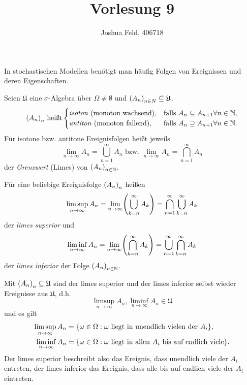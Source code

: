\documentclass{lecture}
\institute{Institut für Statistik und Wirtschaftsmathematik}
\title{Vorlesung 9}
\author{Joshua Feld, 406718}
\begin{document}
    \maketitle


    In stochastischen Modellen benötigt man häufig Folgen von Ereignissen und deren Eigenschaften.

    \begin{definition}
        Seien \(\mathfrak{U}\) eine \(\sigma\)-Algebra über \(\Omega \ne \emptyset\) und \(\parentheses*{A_n}_{n \in N} \subseteq \mathfrak{U}\).
        \[
            \parentheses*{A_n}_n\text{ heißt}\begin{cases}
                \text{\emph{isoton} (monoton wachsend)}, & \text{falls }A_n \subseteq A_{n + 1} \forall n \in \N,\\
                \text{\emph{antiton} (monoton fallend)}, & \text{falls }A_n \supseteq A_{n + 1} \forall n \in \N.
            \end{cases}
        \]
        Für isotone bzw. antitone Ereignisfolgen heißt jeweils
        \[
            \lim_{n \to \infty}A_n = \bigcup_{n = 1}^\infty A_n\text{ bzw. }\lim_{n \to \infty}A_n = \bigcap_{n = 1}^\infty A_n
        \]
        der \emph{Grenzwert} (Limes) von \(\parentheses*{A_n}_{n \in \N}\).

        Für eine beliebige Ereignisfolge \(\parentheses*{A_n}_n\) heißen
        \[
            \limsup_{n \to \infty}A_n = \lim_{n \to \infty}\parentheses*{\bigcup_{k = n}^\infty A_k} = \bigcap_{n = 1}^\infty\bigcup_{k = n}^\infty A_k
        \]
        der \emph{limes superior} und
        \[
            \liminf_{n \to \infty}A_n = \lim_{n \to \infty}\parentheses*{\bigcap_{k = n}^\infty A_k} = \bigcup_{n = 1}^\infty\bigcap_{k = n}^\infty A_k
        \]
        der \emph{limes inferior} der Folge \(\parentheses*{A_n}_{n \in \N}\).
    \end{definition}

    \begin{remark}
        Mit \(\parentheses*{A_n}_n \subseteq \mathfrak{U}\) sind der limes superior und der limes inferior selbst wieder Ereignisse aus \(\mathfrak{U}\), d.h.
        \[
            \limsup_{n \to \infty}A_n, \liminf_{n \to \infty}A_n \in \mathfrak{U}
        \]
        und es gilt
        \begin{align*}
            \limsup_{n \to \infty}A_n &= \braces*{\omega \in \Omega : \omega\text{ liegt in unendlich vielen der }A_i},\\
            \liminf_{n \to \infty}A_n &= \braces*{\omega \in \Omega : \omega\text{ liegt in allen }A_i\text{ bis auf endlich viele}}.
        \end{align*}
        Der limes superior beschreibt also das Ereignis, dass unendlich viele der \(A_i\) entreten, der limes inferior das Ereignis, dass alle bis auf endlich viele der \(A_i\) eintreten.
    \end{remark}
\end{document}
